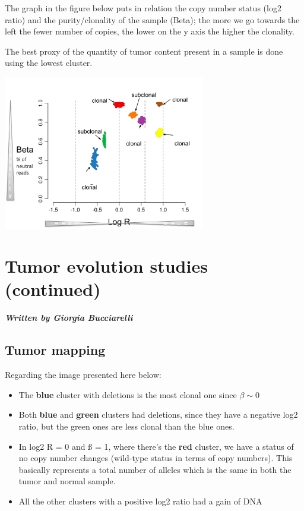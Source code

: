 \graphicspath{{chapters/TumorEvStudiesIIImages/}}

The graph in the figure below puts in relation the copy number status (log2 ratio)
and the purity/clonality of the sample (Beta); the more we go towards the left
the fewer number of copies, the lower on the y axis the higher the clonality.

The best proxy of the quantity of tumor content present in a sample is done
using the lowest cluster.

\includegraphics[width=3.46875in,height=2.65139in]{image2.png}\\



\chapter{Tumor evolution studies (continued)}

\textbf{\textit{Written by Giorgia Bucciarelli}}\\

\section{Tumor mapping}

Regarding the image presented here below:
\begin{itemize}
\item
  The \textbf{blue} cluster with deletions is the most clonal one since $\beta \sim 0$
\item
  Both \textbf{blue} and \textbf{green} clusters had deletions, since they have a negative log2
  ratio, but the green ones are less clonal than the blue ones.
\item
  In log2 R = 0 and ß = 1, where there's the \textbf{red} cluster, we have a status of no
  copy number changes (wild-type status in terms of copy numbers). This
  basically represents a total number of alleles which is the same in both the
  tumor and normal sample.
\item
  All the other clusters with a positive log2 ratio had a gain of DNA
\end{itemize}

